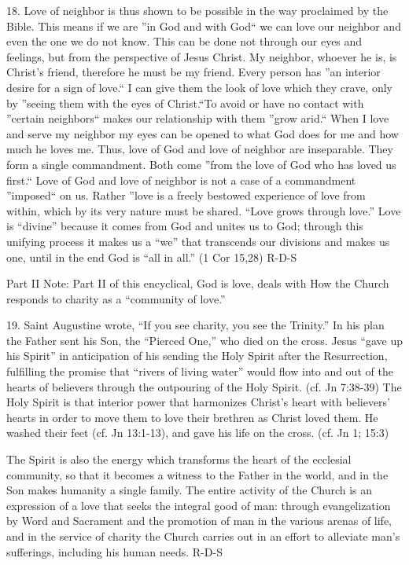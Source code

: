 \documentclass[oneside]{book}
\begin{document}
18. Love of neighbor is thus shown to be possible in the way proclaimed by the
Bible. This means if we are ''in God and with God`` we can love our neighbor and
even the one we do not know. This can be done not through our eyes and feelings,
but from the perspective of Jesus Christ. My neighbor, whoever he is, is
Christ's friend, therefore he must be my friend. Every person has ''an interior
desire for a sign of love.`` I can give them the look of love which they crave,
only by ''seeing them with the eyes of Christ.``To avoid or have no contact with
''certain neighbors`` makes our relationship with them ''grow arid.`` When I
love and serve my neighbor my eyes can be opened to what God does for me and how
much he loves me. Thus, love of God and love of neighbor are inseparable. They
form a single commandment. Both come ''from the love of God who has loved us
first.`` Love of God and love of neighbor is not a case of a commandment
''imposed`` on us. Rather ''love is a freely bestowed experience of love from
within, which by its very nature must be shared. ``Love grows through love.''
Love is ``divine'' because it comes from God and unites us to God; through this
unifying process it makes us a ``we'' that transcends our divisions and makes us
one, until in the end God is ``all in all.'' (1 Cor 15,28)
R-D-S

Part II
Note: Part II of this encyclical, God is love, deals with How the Church
responds to charity as a ``community of love.''

19. Saint Augustine wrote, ``If you see charity, you see the Trinity.'' In his
plan the Father sent his Son, the ``Pierced One,'' who died on the cross. Jesus
``gave up his Spirit'' in anticipation of his sending the Holy Spirit after the
Resurrection, fulfilling the promise that ``rivers of living water'' would flow
into and out of the hearts of believers through the outpouring of the Holy
Spirit. (cf. Jn 7:38-39) The Holy Spirit is that interior power that harmonizes
Christ's heart with believers' hearts in order to move them to love their
brethren as Christ loved them. He washed their feet (cf. Jn 13:1-13), and gave
his life on the cross. (cf. Jn 1; 15:3)

The Spirit is also the energy which transforms the heart of the ecclesial
community, so that it becomes a witness to the Father in the world, and in the
Son makes humanity a single family. The entire activity of the Church is an
expression of a love that seeks the integral good of man: through evangelization
by Word and Sacrament and the promotion of man in the various arenas of life,
and in the service of charity the Church carries out in an effort to alleviate
man's sufferings, including his human needs.
R-D-S
\end{document}
